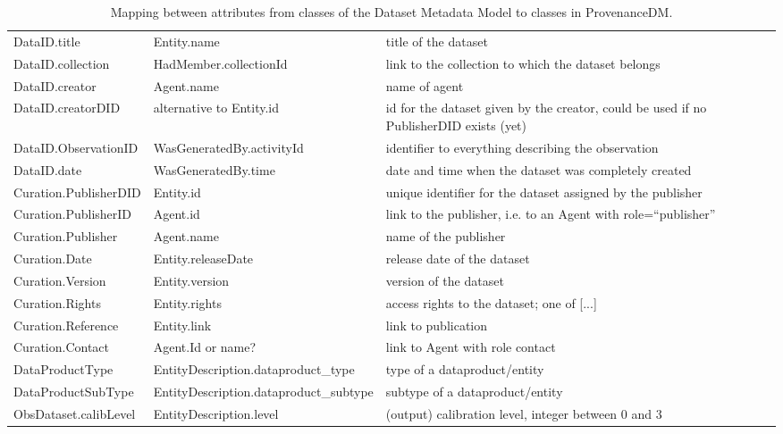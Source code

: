 \begin{table}[h]
\small
{}\textwidth
\begin{tabulary}{1.0\textwidth}{@{}lLp{4cm}@{}}
\toprule
{} &  & \\
\midrule
DataID.title      	 & Entity.name                & title of the dataset\\
DataID.collection    & HadMember.collectionId     & link to the collection to which the dataset belongs\\
DataID.creator       & Agent.name                 & name of agent\\
DataID.creatorDID    & alternative to Entity.id   & id for the dataset given by the creator, could be used if no PublisherDID exists (yet)\\
DataID.ObservationID & WasGeneratedBy.activityId  & identifier to everything describing the observation\\
DataID.date          & WasGeneratedBy.time        & date and time when the dataset was completely created\\
Curation.PublisherDID  & Entity.id                & unique identifier for the dataset assigned by the publisher\\
Curation.PublisherID   & Agent.id                 & link to the publisher, i.e. to an Agent with role=``publisher''\\
Curation.Publisher     & Agent.name               & name of the publisher\\
Curation.Date          & Entity.releaseDate       & release date of the dataset\\
Curation.Version       & Entity.version           & version of the dataset\\
Curation.Rights        & Entity.rights            & access rights to the dataset; one of [...]\\
Curation.Reference     & Entity.link              & link to publication\\
Curation.Contact       & Agent.Id or name? & link to Agent with role contact\\
DataProductType  & EntityDescription.dataproduct\_type & type of a dataproduct/entity\\
DataProductSubType & EntityDescription.dataproduct\_subtype & subtype of a dataproduct/entity\\
ObsDataset.calibLevel  & EntityDescription.level & (output) calibration level, integer between 0 and 3\\\hline
\bottomrule
\end{tabulary}
\caption{Mapping between attributes from classes of the Dataset Metadata Model to classes in ProvenanceDM.}
\label{tab:datasetmapping}
\end{table}


